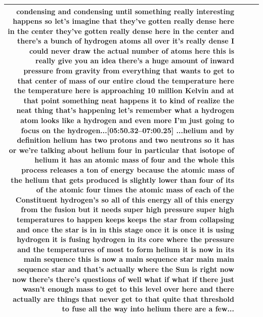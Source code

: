 \documentclass[10pt]{article}
\begin{document}
\begin{tiny}
\begin{longtable}{|r|p{0.375in}|p{1.275in}|p{3.5in}|}
condensing and condensing until something really interesting happens so let's imagine that they've gotten really dense here in the center they've gotten really dense here in the center and there's a bunch of hydrogen atoms all over it's really dense I could never draw the actual number of atoms here this is really give you an idea there's a huge amount of inward pressure from gravity from everything that wants to get to that center of mass of our entire cloud the temperature here the temperature here is approaching 10 million Kelvin and at that point something neat happens it to kind of realize the neat thing that's happening let's remember what a hydrogen atom looks like a hydrogen and even more I'm just going to focus on the hydrogen...\newline\textbf{[05:50.32--07:00.25]} ...helium and by definition helium has two protons and two neutrons so it has or we're talking about helium four in particular that isotope of helium it has an atomic mass of four and the whole this process releases a ton of energy because the atomic mass of the helium that gets produced is slightly lower than four of its of the atomic four times the atomic mass of each of the Constituent hydrogen's so all of this energy all of this energy from the fusion but it needs super high pressure super high temperatures to happen keeps keeps the star from collapsing and once the star is in in this stage once it is once it is using hydrogen it is fusing hydrogen in its core where the pressure and the temperatures of most to form helium it is now in its main sequence this is now a main sequence star main main sequence star and that's actually where the Sun is right now now there's there's questions of well what if what if there just wasn't enough mass to get to this level over here and there actually are things that never get to that quite that threshold to fuse all the way into helium there are a few... \\\hline

\end{longtable}
\end{tiny}
\end{document}
